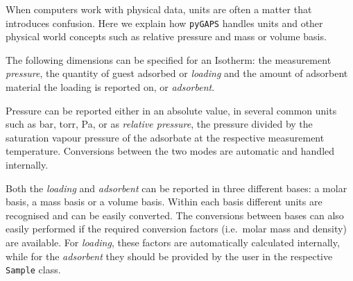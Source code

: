 When computers work with physical data, units are often a matter that introduces
confusion. Here we explain how \texttt{pyGAPS} handles units and other physical
world concepts such as relative pressure and mass or volume basis.

The following dimensions can be specified for an Isotherm: the measurement \textit{pressure},
the quantity of guest adsorbed or \textit{loading} and the amount of adsorbent material
the loading is reported on, or \textit{adsorbent}.

Pressure can be reported either in an absolute value, in several common units such as
\si{\bar}, torr, \si{\pascal}, or as \textit{relative pressure}, the pressure
divided by the saturation vapour pressure of the adsorbate at the respective measurement
temperature. Conversions between the two modes are automatic and handled internally.

Both the \textit{loading} and \textit{adsorbent} can be reported in three different bases:
a molar basis, a mass basis or a volume basis. Within each basis different
units are recognised and can be easily converted. The conversions between bases can also
easily performed if the required conversion factors (i.e.\ molar mass and density) are
available. For \textit{loading}, these factors are automatically calculated internally, while
for the \textit{adsorbent} they should be provided by the user in the respective
\texttt{Sample} class.